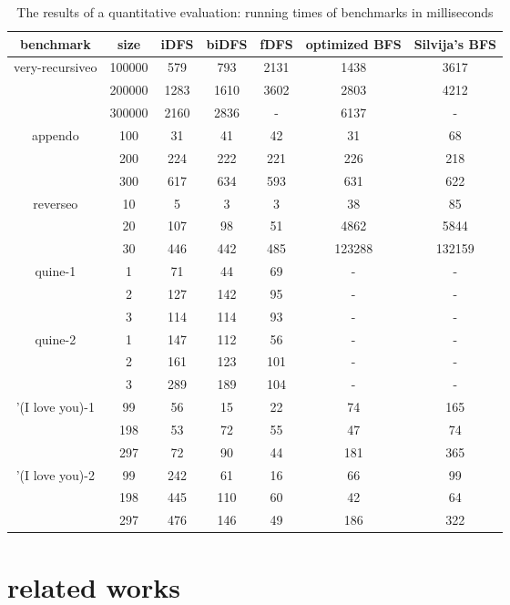 \documentclass[format=acmlarge, review=true, authordraft=true]{acmart}
\begin{document}
\begin{table}
\begin{tabular}{|c|c|c|c|c|c|c|}
	\hline 
	benchmark & size & iDFS & biDFS & fDFS & optimized BFS & Silvija's BFS  \\
	\hline
	very-recursiveo & 100000 &  579 &  793 & 2131 & 1438 & 3617 \\
	                & 200000 & 1283 & 1610 & 3602 & 2803 & 4212 \\
	                & 300000 & 2160 & 2836 &    - & 6137 &    - \\
	\hline 
	appendo  & 100 &  31 &  41 &  42 &  31 &  68 \\ 
	         & 200 & 224 & 222 & 221 & 226 & 218 \\ 
	         & 300 & 617 & 634 & 593 & 631 & 622 \\ 
	\hline 
	reverseo & 10 &   5 &   3 &   3 &     38 &     85 \\ 
		     & 20 & 107 &  98 &  51 &   4862 &   5844 \\
		     & 30 & 446 & 442 & 485 & 123288 & 132159 \\ 
    \hline
    quine-1 & 1 &  71 &  44 & 69 & - & - \\ 
	        & 2 & 127 & 142 & 95 & - & - \\ 
	        & 3 & 114 & 114 & 93 & - & - \\ 
	\hline
    quine-2 & 1 & 147 & 112 &  56 & - & - \\ 
	        & 2 & 161 & 123 & 101 & - & - \\ 
	        & 3 & 289 & 189 & 104 & - & - \\ 
	\hline 
	'(I love you)-1 &  99 & 56 & 15 & 22 &  74 & 165 \\ 
	                & 198 & 53 & 72 & 55 &  47 &  74 \\
	                & 297 & 72 & 90 & 44 & 181 & 365 \\ 
    \hline
    '(I love you)-2 &  99 & 242 &  61 & 16 &  66 &  99 \\ 
	                & 198 & 445 & 110 & 60 &  42 &  64 \\
	                & 297 & 476 & 146 & 49 & 186 & 322 \\ 
	\hline 
\end{tabular}
\caption{The results of a quantitative evaluation: running times of benchmarks 
in milliseconds}
\label{compare-efficiency}
\end{table}

\section{related works}
\end{document}
